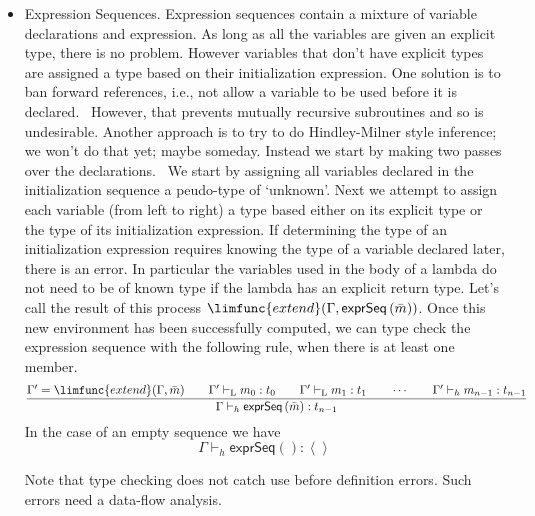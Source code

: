 \documentclass[12pt]{article}
\begin{document}
\begin{itemize}
\item Expression Sequences. Expression sequences contain a mixture of
variable declarations and expression. As long as all the variables are given
an explicit type, there is no problem. However variables that don't have
explicit types are assigned a type based on their initialization expression.
One solution is to ban forward references, i.e., not allow a variable to be
used before it is declared. \ However, that prevents mutually recursive
subroutines and so is undesirable. Another approach is to try to do
Hindley-Milner style inference; we won't do that yet; maybe someday. Instead
we start by making two passes over the declarations. \ We start by assigning
all variables declared in the initialization sequence a peudo-type of
`unknown'. Next we attempt to assign each variable (from left to right) a
type based either on its explicit type or the type of its initialization
expression. If determining the type of an initialization expression requires
knowing the type of a variable declared later, there is an error. In
particular the variables used in the body of a lambda do not need to be of
known type if the lambda has an explicit return type. Let's call the result
of this process $\limfunc{extend}(\Gamma ,\mathsf{exprSeq}\left( \bar{m}%
\right) )$. Once this new environment has been successfully computed, we can
type check the expression sequence with the following rule, when there is at
least one member.%
\begin{equation*}
\frac{\Gamma ^{\prime }=\limfunc{extend}(\Gamma ,\bar{m})\qquad \Gamma
^{\prime }\vdash _{\mathrm{L}}m_{0}:t_{0}\qquad \Gamma ^{\prime }\vdash _{%
\mathrm{L}}m_{1}:t_{1}\qquad \cdots \qquad \Gamma ^{\prime }\vdash
_{h}m_{n-1}:t_{n-1}}{\Gamma \vdash _{h}\mathsf{exprSeq}\left( \bar{m}\right)
:t_{n-1}}
\end{equation*}%
In the case of an empty sequence we have%
\begin{equation*}
\Gamma \vdash _{h}\mathsf{exprSeq}\left( {}\right) :\left\langle
{}\right\rangle 
\end{equation*}

Note that type checking does not catch use before definition errors. Such
errors need a data-flow analysis.


\end{itemize}
\end{document}

